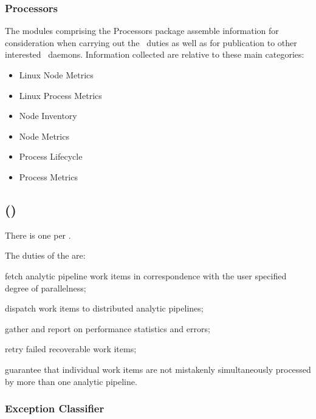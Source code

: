 \begin{itemize}
\begin{itemize}
    \end{itemize}   
    
    \subsubsection{Processors} 
    
    The modules comprising the Processors package assemble information for
    consideration when carrying out the \varAgent~duties as well as for publication
    to other interested \varDUCC~daemons.  Information collected are relative to
    these main categories:
    
    \begin{itemize}
      \item Linux Node Metrics
      \item Linux Process Metrics
      \item Node Inventory
      \item Node Metrics
      \item Process Lifecycle
      \item Process Metrics
    \end{itemize}   

    \subsection{\varJobDriver (\varJD)}    

    There is one \varJobDriver per \varJob.
    
    The duties of the \varJobDriver are:
    
    \begin{description}
      \item fetch analytic pipeline work items in correspondence with the user specified degree of parallelness;
      \item dispatch work items to distributed analytic pipelines;
      \item gather and report on performance statistics and errors;
      \item retry failed recoverable work items;
      \item guarantee that individual work items are not mistakenly simultaneously processed by more than one analytic pipeline.
    \end{description}
        
    \subsubsection{Exception Classifier}
         

\end{itemize}
